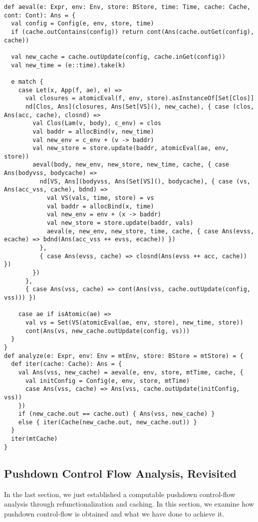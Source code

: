 \documentclass[acmsmall,review,anonymous]{acmart}\settopmatter{printfolios=true,printccs=false,printacmref=false}
\begin{document}
\begin{lstlisting}
def aeval(e: Expr, env: Env, store: BStore, time: Time, cache: Cache, cont: Cont): Ans = {
  val config = Config(e, env, store, time)
  if (cache.outContains(config)) return cont(Ans(cache.outGet(config), cache))

  val new_cache = cache.outUpdate(config, cache.inGet(config))
  val new_time = (e::time).take(k)

  e match {
    case Let(x, App(f, ae), e) =>
      val closures = atomicEval(f, env, store).asInstanceOf[Set[Clos]]
      nd[Clos, Ans](closures, Ans(Set[VS](), new_cache), { case (clos, Ans(acc, cache), closnd) =>
        val Clos(Lam(v, body), c_env) = clos
        val baddr = allocBind(v, new_time)
        val new_env = c_env + (v -> baddr)
        val new_store = store.update(baddr, atomicEval(ae, env, store))
        aeval(body, new_env, new_store, new_time, cache, { case Ans(bodyvss, bodycache) =>
          nd[VS, Ans](bodyvss, Ans(Set[VS](), bodycache), { case (vs, Ans(acc_vss, cache), bdnd) =>
            val VS(vals, time, store) = vs
            val baddr = allocBind(x, time)
            val new_env = env + (x -> baddr)
            val new_store = store.update(baddr, vals)
            aeval(e, new_env, new_store, time, cache, { case Ans(evss, ecache) => bdnd(Ans(acc_vss ++ evss, ecache)) })
          },
          { case Ans(evss, cache) => closnd(Ans(evss ++ acc, cache)) })
        })
      },
      { case Ans(vss, cache) => cont(Ans(vss, cache.outUpdate(config, vss))) })

    case ae if isAtomic(ae) =>
      val vs = Set(VS(atomicEval(ae, env, store), new_time, store))
      cont(Ans(vs, new_cache.outUpdate(config, vs)))
  }
}
def analyze(e: Expr, env: Env = mtEnv, store: BStore = mtStore) = {
  def iter(cache: Cache): Ans = {
    val Ans(vss, new_cache) = aeval(e, env, store, mtTime, cache, {
      val initConfig = Config(e, env, store, mtTime)
      case Ans(vss, cache) => Ans(vss, cache.outUpdate(initConfig, vss))
    })
    if (new_cache.out == cache.out) { Ans(vss, new_cache) }
    else { iter(Cache(new_cache.out, new_cache.out)) }
  }
  iter(mtCache)
}
\end{lstlisting}

\subsection{Pushdown Control Flow Analysis, Revisited} \label{pdcfarevisit}

In the last section, we just established a computable pushdown control-flow
analysis through refunctionalization and caching. In this section,
we examine how pushdown control-flow is obtained and what we have done to
achieve it.
\end{document}
